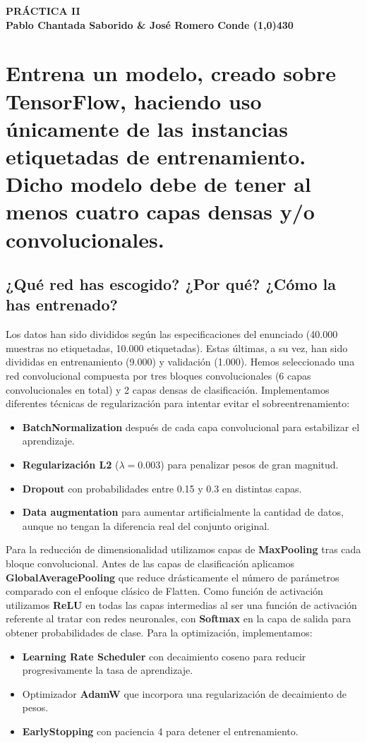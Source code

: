 \documentclass{article}
\begin{document}
\begin{center}
    \LARGE\bfseries PRÁCTICA II\\
    \small Pablo Chantada Saborido \& José Romero Conde
    \line(1,0){430}
\end{center}


\newpage

\section{Entrena un modelo, creado sobre TensorFlow, haciendo uso únicamente de las instancias etiquetadas de entrenamiento. Dicho modelo debe de tener al menos cuatro capas densas y/o convolucionales.}
\subsection{¿Qué red has escogido? ¿Por qué? ¿Cómo la has entrenado?}
Los datos han sido divididos según las especificaciones del enunciado (40.000 muestras no etiquetadas, 10.000 etiquetadas). Estas últimas, a su vez, han sido divididas en entrenamiento (9.000) y validación (1.000).
Hemos seleccionado una red convolucional compuesta por tres bloques convolucionales (6 capas convolucionales en total) y 2 capas densas de clasificación. Implementamos diferentes técnicas de regularización para intentar evitar el sobreentrenamiento:
\begin{itemize}
\item \textbf{BatchNormalization} después de cada capa convolucional para estabilizar el aprendizaje.
\item \textbf{Regularización L2} ($\lambda = 0.003$) para penalizar pesos de gran magnitud.
\item \textbf{Dropout} con probabilidades entre 0.15 y 0.3 en distintas capas.
\item \textbf{Data augmentation} para aumentar artificialmente la cantidad de datos, aunque no tengan la diferencia real del conjunto original.
\end{itemize}
Para la reducción de dimensionalidad utilizamos capas de \textbf{MaxPooling} tras cada bloque convolucional. Antes de las capas de clasificación aplicamos \textbf{GlobalAveragePooling} que reduce drásticamente el número de parámetros comparado con el enfoque clásico de Flatten.
Como función de activación utilizamos \textbf{ReLU} en todas las capas intermedias al ser una función de activación referente al tratar con redes neuronales, con \textbf{Softmax} en la capa de salida para obtener probabilidades de clase.
Para la optimización, implementamos:
\begin{itemize}
\item \textbf{Learning Rate Scheduler} con decaimiento coseno para reducir progresivamente la tasa de aprendizaje.
\item Optimizador \textbf{AdamW} que incorpora una regularización de decaimiento de pesos.
\item \textbf{EarlyStopping} con paciencia 4 para detener el entrenamiento.
\end{itemize}
\end{document}
